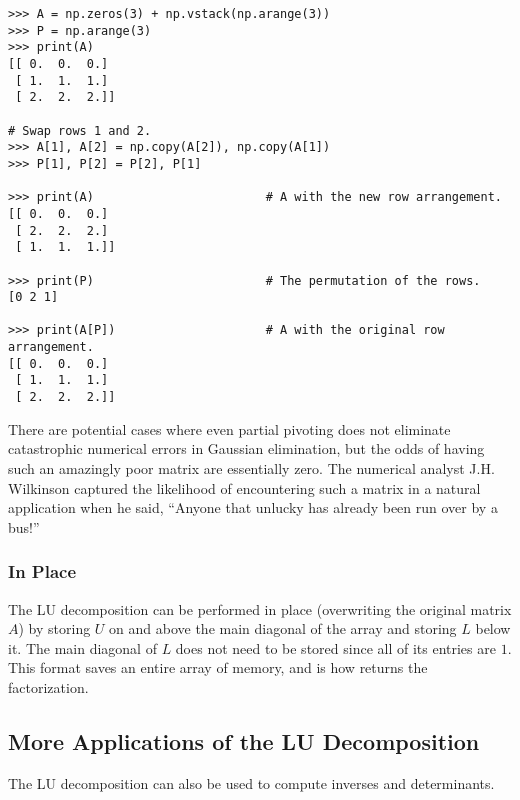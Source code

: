 \begin{lstlisting}
>>> A = np.zeros(3) + np.vstack(np.arange(3))
>>> P = np.arange(3)
>>> print(A)
[[ 0.  0.  0.]
 [ 1.  1.  1.]
 [ 2.  2.  2.]]

# Swap rows 1 and 2.
>>> A[1], A[2] = np.copy(A[2]), np.copy(A[1])
>>> P[1], P[2] = P[2], P[1]

>>> print(A)                        # A with the new row arrangement.
[[ 0.  0.  0.]
 [ 2.  2.  2.]
 [ 1.  1.  1.]]

>>> print(P)                        # The permutation of the rows.
[0 2 1]

>>> print(A[P])                     # A with the original row arrangement.
[[ 0.  0.  0.]
 [ 1.  1.  1.]
 [ 2.  2.  2.]]
\end{lstlisting}

There are potential cases where even partial pivoting does not eliminate catastrophic numerical errors in Gaussian elimination, but the odds of having such an amazingly poor matrix are essentially zero.
The numerical analyst J.H. Wilkinson captured the likelihood of encountering such a matrix in a natural application when he said, ``Anyone that unlucky has already been run over by a bus!''

\subsubsection*{In Place} %

The LU decomposition can be performed in place (overwriting the original matrix $A$) by storing $U$ on and above the main diagonal of the array and storing $L$ below it.
The main diagonal of $L$ does not need to be stored since all of its entries are $1$.
This format saves an entire array of memory, and is how  returns the factorization.

\subsection*{More Applications of the LU Decomposition} %

The LU decomposition can also be used to compute inverses and determinants.

